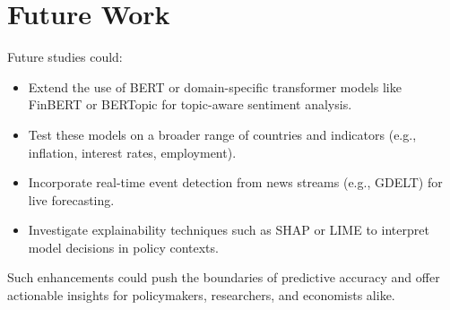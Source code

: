 \section{Future Work}
\label{sec:future-work}

Future studies could:
\begin{itemize}
    \item Extend the use of BERT or domain-specific transformer models like FinBERT or BERTopic for topic-aware sentiment analysis.
    \item Test these models on a broader range of countries and indicators (e.g., inflation, interest rates, employment).
    \item Incorporate real-time event detection from news streams (e.g., GDELT) for live forecasting.
    \item Investigate explainability techniques such as SHAP or LIME to interpret model decisions in policy contexts.
\end{itemize}

Such enhancements could push the boundaries of predictive accuracy and offer actionable insights for policymakers, researchers, and economists alike.